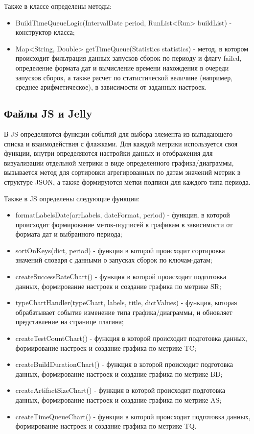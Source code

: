 Также в классе определены методы:

\begin{itemize}
	\item BuildTimeQueueLogic(IntervalDate period, RunList<Run> buildList) - конструктор класса;
	\item Map<String, Double> getTimeQueue(Statistics statistics) - метод, в котором происходит фильтрация данных запусков сборок по периоду и флагу failed, определение формата дат и вычисление времени нахождения в очереди запусков сборок, а также расчет по статистической величине (например, среднее арифметическое), в зависимости от заданных настроек.
\end{itemize}

\subsection{Файлы JS и Jelly}

В JS определяются функции событий для выбора элемента из выпадающего списка и взаимодействия с флажками. Для каждой метрики используется своя функции, внутри определяются настройки данных и отображения для визуализации отдельной метрики в виде определенного графика/диаграммы, вызывается метод для сортировки агрегированных по датам значений метрик в структуре JSON, а также формируются метки-подписи для каждого типа периода.

Также в JS определены следующие функции:

\begin{itemize}
	\item formatLabelsDate(arrLabels, dateFormat, period) - функция, в которой происходит формирование меток-подписей к графикам в зависимости от формата дат и выбранного периода;
	\item sortOnKeys(dict, period) - функция в которой происходит сортировка значений словаря с данными о запусках сборок по ключам-датам;
	\item createSuccessRateChart() - функция в которой происходит подготовка данных, формирование настроек и создание графика по метрике SR;
	\item typeChartHandler(typeChart, labels, title, dictValues) - функция, которая обрабатывает событие изменение типа графика/диаграммы, и обновляет представление на странице плагина;
	\item createTestCountChart() - функция в которой происходит подготовка данных, формирование настроек и создание графика по метрике TC;
	\item createBuildDurationChart() - функция в которой происходит подготовка данных, формирование настроек и создание графика по метрике BD;
	\item createArtifactSizeChart() - функция в которой происходит подготовка данных, формирование настроек и создание графика по метрике AS;
	\item createTimeQueueChart() - функция в которой происходит подготовка данных, формирование настроек и создание графика по метрике TQ.
\end{itemize}

